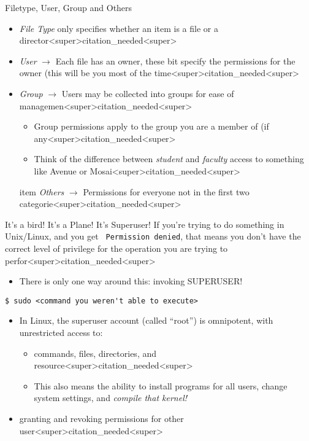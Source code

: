 \documentclass[11pt]{beamer}
\begin{document}
\begin{frame}{Filetype, User, Group and Others}
\begin{itemize}
\item \textit{File Type} only specifies whether an item is a file or a director<super>citation_needed<super>
\item \textit{User} $\rightarrow$ Each file has an owner, these bit specify the permissions for the owner (this will be you most of the time<super>citation_needed<super>
\item \textit{Group} $\rightarrow$ Users may be collected into groups for ease of managemen<super>citation_needed<super> 
\begin{itemize}
\item Group permissions apply to the group you are a member of (if any<super>citation_needed<super>
\item Think of the difference between \emph{student} and \emph{faculty} access to something like Avenue or Mosai<super>citation_needed<super>  
\end{itemize}
item \textit{Others} $\rightarrow$ Permissions for everyone not in the first two categorie<super>citation_needed<super>  
\end{itemize}
\end{frame}

\begin{frame}[fragile=singleslide]{It's a bird! It's a Plane! It's Superuser!}
If you're trying to do something in Unix/Linux, and you get \texttt{ Permission denied}, that means you don't have the correct level of privilege for the operation you are trying to perfor<super>citation_needed<super>
	\begin{itemize}
	\item There is only one way around this: invoking SUPERUSER!
	\end{itemize}
\begin{lstlisting}[style=terminal]
$ sudo <command you weren't able to execute>
\end{lstlisting}
	\begin{itemize}
	\item In Linux, the superuser account (called ``root'') is omnipotent, with unrestricted access to:
		\begin{itemize}
		\item commands, files, directories, and resource<super>citation_needed<super>
		\item This also means the ability to install programs for all users, change system settings, and \emph{compile that kernel!}
		\end{itemize}
	\item granting and revoking permissions for other user<super>citation_needed<super>
	\end{itemize}
\end{frame}
\end{document}
